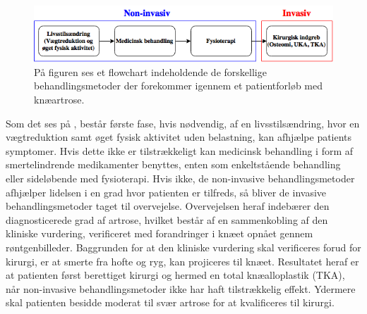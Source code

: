 \begin{figure}[H]
	\centering
	\includegraphics[width=1\textwidth]{figures/bProblemanalyse/flowchart_behandlingsforloeb.png}
	\caption{På figuren ses et flowchart indeholdende de forskellige behandlingsmetoder der forekommer igennem et patientforløb med knæartrose.}
	\label{fig:flow_behandlingsfaser}
\end{figure}\vspace{-.25cm}

Som det ses på , består første fase, hvis nødvendig, af en livsstilsændring, hvor en vægtreduktion samt øget fysisk aktivitet uden belastning, kan afhjælpe patients symptomer. Hvis dette ikke er tilstrækkeligt kan medicinsk behandling i form af smertelindrende medikamenter benyttes, enten som enkeltstående behandling eller sideløbende med fysioterapi. Hvis ikke, de non-invasive behandlingsmetoder afhjælper lidelsen i en grad hvor patienten er tilfreds, så bliver de invasive behandlingsmetoder taget til overvejelse. Overvejelsen heraf indebærer den diagnosticerede grad af artrose, hvilket består af en sammenkobling af den kliniske vurdering, verificeret med forandringer i knæet opnået gennem røntgenbilleder. Baggrunden for at den kliniske vurdering skal verificeres forud for kirurgi, er at smerte fra hofte og ryg, kan projiceres til knæet. Resultatet heraf er at patienten først berettiget kirurgi og hermed en total knæalloplastik (TKA), når non-invasive behandlingsmetoder ikke har haft tilstrækkelig effekt. Ydermere skal patienten besidde moderat til svær artrose for at kvalificeres til kirurgi. \citep{Lind2016b} \citep{brostrom2012} \citep{skou2016}

